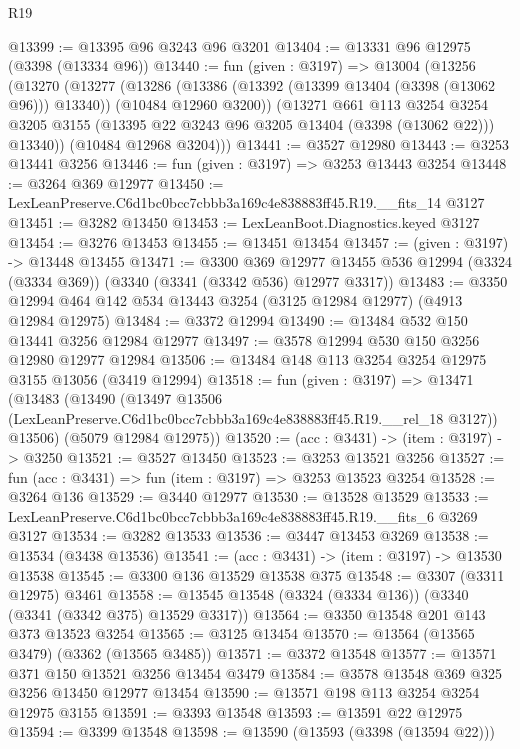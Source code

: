 \begin{lexlean}{R19}
\begin{coremodule}
@13399 := @13395 @96 @3243 @96 @3201
@13404 := @13331 @96 @12975 (@3398 (@13334 @96))
@13440 := fun (given : @3197) =>
  @13004
    (@13256
      (@13270
        (@13277
          (@13286
            (@13386 (@13392 (@13399 @13404 (@3398 (@13062 @96))) @13340))
            (@10484 @12960 @3200))
          (@13271
            @661
            @113
            @3254
            @3254
            @3205
            @3155
            (@13395 @22 @3243 @96 @3205 @13404 (@3398 (@13062 @22)))
            @13340))
        (@10484 @12968 @3204)))
@13441 := @3527 @12980
@13443 := @3253 @13441 @3256
@13446 := fun (given : @3197) => @3253 @13443 @3254
@13448 := @3264 @369 @12977
@13450 := LexLeanPreserve.C6d1bc0bcc7cbbb3a169c4e838883ff45.R19.__fits_14 @3127
@13451 := @3282 @13450
@13453 := LexLeanBoot.Diagnostics.keyed @3127
@13454 := @3276 @13453
@13455 := @13451 @13454
@13457 := (given : @3197) -> @13448 @13455
@13471 := @3300
    @369
    @12977
    @13455
    @536
    @12994
    (@3324 (@3334 @369))
    (@3340 (@3341 (@3342 @536) @12977 @3317))
@13483 := @3350 @12994 @464 @142 @534 @13443 @3254 (@3125 @12984 @12977) (@4913 @12984 @12975)
@13484 := @3372 @12994
@13490 := @13484 @532 @150 @13441 @3256 @12984 @12977
@13497 := @3578 @12994 @530 @150 @3256 @12980 @12977 @12984
@13506 := @13484 @148 @113 @3254 @3254 @12975 @3155 @13056 (@3419 @12994)
@13518 := fun (given : @3197) =>
  @13471
    (@13483
      (@13490
        (@13497 @13506 (LexLeanPreserve.C6d1bc0bcc7cbbb3a169c4e838883ff45.R19.__rel_18 @3127))
        @13506)
      (@5079 @12984 @12975))
@13520 := (acc : @3431) -> (item : @3197) -> @3250
@13521 := @3527 @13450
@13523 := @3253 @13521 @3256
@13527 := fun (acc : @3431) => fun (item : @3197) => @3253 @13523 @3254
@13528 := @3264 @136
@13529 := @3440 @12977
@13530 := @13528 @13529
@13533 := LexLeanPreserve.C6d1bc0bcc7cbbb3a169c4e838883ff45.R19.__fits_6 @3269 @3127
@13534 := @3282 @13533
@13536 := @3447 @13453 @3269
@13538 := @13534 (@3438 @13536)
@13541 := (acc : @3431) -> (item : @3197) -> @13530 @13538
@13545 := @3300 @136 @13529 @13538 @375
@13548 := @3307 (@3311 @12975) @3461
@13558 := @13545 @13548 (@3324 (@3334 @136)) (@3340 (@3341 (@3342 @375) @13529 @3317))
@13564 := @3350 @13548 @201 @143 @373 @13523 @3254
@13565 := @3125 @13454
@13570 := @13564 (@13565 @3479) (@3362 (@13565 @3485))
@13571 := @3372 @13548
@13577 := @13571 @371 @150 @13521 @3256 @13454 @3479
@13584 := @3578 @13548 @369 @325 @3256 @13450 @12977 @13454
@13590 := @13571 @198 @113 @3254 @3254 @12975 @3155
@13591 := @3393 @13548
@13593 := @13591 @22 @12975
@13594 := @3399 @13548
@13598 := @13590 (@13593 (@3398 (@13594 @22)))

\end{coremodule}
\end{lexlean}
